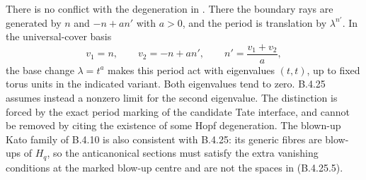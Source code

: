 \begin{remark}
There is no conflict with the degeneration in
\citet[Section 13, pp.~116--118]{Oda1978D}.
There the boundary rays are generated by $n$ and
$-n+a n'$ with $a>0$, and the period is translation
by $\lambda^{n'}$. In the universal-cover basis
\[
 v_1=n,\qquad v_2=-n+a n',\qquad
 n'=\frac{v_1+v_2}{a},
\]
the base change $\lambda=t^a$ makes this period
act with eigenvalues $(t,t)$, up to fixed torus
units in the indicated variant. Both eigenvalues
tend to zero. B.4.25 assumes instead a nonzero
limit for the second eigenvalue. The distinction
is forced by the exact period marking of the
candidate Tate interface, and cannot be removed
by citing the existence of some Hopf degeneration.
The blown-up Kato family of B.4.10 is also consistent
with B.4.25: its generic fibres are blow-ups of
$H_q$, so the anticanonical sections must satisfy
the extra vanishing conditions at the marked
blow-up centre and are not the spaces in
(B.4.25.5).
\end{remark}
